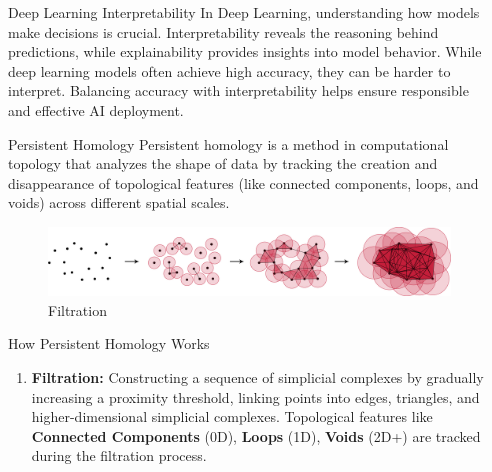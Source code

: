 \documentclass[final]{beamer}
\newlength{\sepwidth}
\newlength{\colwidth}
\newcommand{\separatorcolumn}{\begin{column}{\sepwidth}\end{column}}
\begin{document}
\begin{frame}[t]
\begin{columns}[t]
\separatorcolumn

\begin{column}{\colwidth}

  \begin{alertblock} {Deep Learning Interpretability}
          In Deep Learning, understanding how models make decisions is crucial. Interpretability reveals the reasoning behind predictions, while explainability provides insights into model behavior. While deep learning models often achieve high accuracy, they can be harder to interpret. Balancing accuracy with interpretability helps ensure responsible and effective AI deployment.
  \end{alertblock}

  
    \begin{block} {Persistent Homology}
        Persistent homology is a method in computational topology that analyzes the shape of data by tracking the creation and disappearance of topological features (like connected components, loops, and voids) across different spatial scales.

        \begin{figure}
            \centering
            \includegraphics[width=1\linewidth]{figures/ph_process.png}
            \caption{Filtration}
            \label{fig:filtration}
        \end{figure}

    \end{block}

    \begin{block} {How Persistent Homology Works}

    \begin{enumerate}

        \item \textbf{Filtration:} Constructing a sequence of simplicial complexes by gradually increasing a proximity threshold, linking points into edges, triangles, and higher-dimensional simplicial complexes. Topological features like \textbf{Connected Components} (0D), \textbf{Loops} (1D), \textbf{Voids} (2D+) are tracked during the filtration process. 



\end{enumerate}
\end{block}
\end{column}
\end{columns}
\end{frame}
\end{document}
